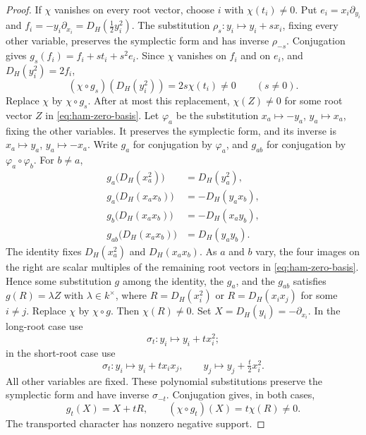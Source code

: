 \documentclass[11pt,reqno]{amsart}
\theoremstyle{definition}
\theoremstyle{remark}
\theoremstyle{definition}
\begin{document}
\begin{proof}
If $\chi$ vanishes on every root vector, choose $i$ with $\chi(t_i)\ne0$.
Put $e_i=x_i\partial_{y_i}$ and $f_i=-y_i\partial_{x_i}=D_H(\tfrac12 y_i^2)$.
The substitution $\rho_s:y_i\mapsto y_i+sx_i$, fixing every other variable,
preserves the symplectic form and has inverse $\rho_{-s}$.  Conjugation gives
$g_s(f_i)=f_i+st_i+s^2e_i$.
Since $\chi$ vanishes on $f_i$ and on $e_i$, and $D_H(y_i^2)=2f_i$,
\[
 (\chi\circ g_s)(D_H(y_i^2))=2s\chi(t_i)\ne0\qquad(s\ne0).
\]
Replace $\chi$ by $\chi\circ g_s$.
After at most this replacement, $\chi(Z)\ne0$ for some root vector $Z$
in \eqref{eq:ham-zero-basis}.
Let $\varphi_a$ be the substitution $x_a\mapsto -y_a$, $y_a\mapsto x_a$,
fixing the other variables.  It preserves the symplectic form, and its
inverse is $x_a\mapsto y_a$, $y_a\mapsto -x_a$.  Write $g_a$ for conjugation
by $\varphi_a$, and $g_{ab}$ for conjugation by $\varphi_a\circ\varphi_b$.
For $b\ne a$,
\begin{align*}
 g_a\bigl(D_H(x_a^2)\bigr)&=D_H(y_a^2),\\
 g_a\bigl(D_H(x_ax_b)\bigr)&=-D_H(y_ax_b),\\
 g_b\bigl(D_H(x_ax_b)\bigr)&=-D_H(x_ay_b),\\
 g_{ab}\bigl(D_H(x_ax_b)\bigr)&=D_H(y_ay_b).
\end{align*}
The identity fixes $D_H(x_a^2)$ and $D_H(x_ax_b)$.  As $a$ and $b$ vary,
the four images on the right are scalar multiples of the remaining root
vectors in \eqref{eq:ham-zero-basis}.  Hence some substitution $g$ among
the identity, the $g_a$, and the $g_{ab}$ satisfies $g(R)=\lambda Z$ with
$\lambda\in k^\times$, where $R=D_H(x_i^2)$ or $R=D_H(x_ix_j)$ for some
$i\ne j$.  Replace $\chi$ by $\chi\circ g$.  Then $\chi(R)\ne0$.
Set $X=D_H(y_i)=-\partial_{x_i}$.
In the long-root case use
\[
 \sigma_t:y_i\mapsto y_i+tx_i^2;
\]
in the short-root case use
\[
 \sigma_t:y_i\mapsto y_i+tx_ix_j,\qquad
 y_j\mapsto y_j+\tfrac t2x_i^2.
\]
All other variables are fixed. These polynomial substitutions preserve
the symplectic form and have inverse $\sigma_{-t}$.
Conjugation gives, in both cases,
\[
 g_t(X)=X+tR,\qquad (\chi\circ g_t)(X)=t\chi(R)\ne0.
\]
The transported character has nonzero negative support.
\end{proof}
\end{document}
